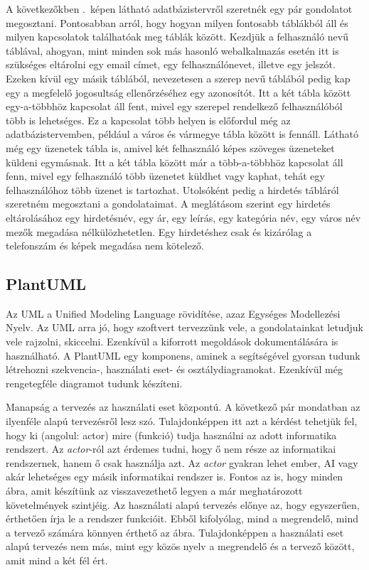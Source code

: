 \documentclass[]{thesis-ekf}
\theoremstyle{definition}
\theoremstyle{remark}
\begin{document}
	A következőkben .~képen látható adatbázistervről szeretnék egy pár gondolatot megosztani. Pontosabban arról, hogy hogyan milyen fontosabb táblákból áll és milyen kapcsolatok találhatóak meg táblák között. Kezdjük a felhasználó nevű táblával, ahogyan, mint minden sok más hasonló webalkalmazás esetén itt is szükséges eltárolni egy email címet, egy felhasználónevet, illetve egy jelszót. Ezeken kívül egy másik táblából, nevezetesen a szerep nevű táblából pedig kap egy a megfelelő jogosultság ellenőrzéséhez egy azonosítót. Itt a két tábla között egy-a-többhöz kapcsolat áll fent, mivel egy szerepel rendelkező felhasználóból több is lehetséges. Ez a kapcsolat több helyen is előfordul még az adatbázistervemben, például a város és vármegye tábla között is fennáll. Látható még egy üzenetek tábla is, amivel két felhasználó képes szöveges üzeneteket küldeni egymásnak. Itt a két tábla között már a több-a-többhöz kapcsolat áll fenn, mivel egy felhasználó több üzenetet küldhet vagy kaphat, tehát egy felhasználóhoz több üzenet is tartozhat. Utolsóként pedig a hirdetés tábláról szeretném megosztani a gondolataimat. A meglátásom szerint egy hirdetés eltárolásához egy hirdetésnév, egy ár, egy leírás, egy kategória név, egy város név mezők megadása nélkülözhetetlen. Egy hirdetéshez csak és kizárólag a telefonszám és képek megadása nem kötelező. 
	
	\subsection{PlantUML}\label{sc-plantuml}
	Az UML a Unified Modeling Language rövidítése, azaz Egységes Modellezési Nyelv. Az UML arra jó, hogy szoftvert tervezzünk vele, a gondolatainkat letudjuk vele rajzolni, skiccelni. Ezenkívül a kiforrott megoldások dokumentálására is használható. A PlantUML egy komponens, aminek a segítségével gyorsan tudunk létrehozni szekvencia-, használati eset- és osztálydiagramokat. Ezenkívül még rengetegféle diagramot tudunk készíteni. \cite{PlantUML}
	
	Manapság a tervezés az használati eset központú. A következő pár mondatban az ilyenféle alapú tervezésről lesz szó. Tulajdonképpen itt azt a kérdést tehetjük fel, hogy ki (angolul: actor) mire (funkció) tudja használni az adott informatika rendszert. Az \emph{actor}-ról azt érdemes tudni, hogy ő nem része az informatikai rendszernek, hanem ő csak használja azt. Az \emph{actor} gyakran lehet ember, AI vagy akár lehetséges egy másik informatikai rendszer is. Fontos az is, hogy minden ábra, amit készítünk az visszavezethető legyen a már meghatározott követelmények szintjéig. Az használati alapú tervezés előnye az, hogy egyszerűen, érthetően írja le a rendszer funkcióit. Ebből kifolyólag, mind a megrendelő, mind a tervező számára könnyen érthető az ábra. Tulajdonképpen a használati eset alapú tervezés nem más, mint egy közös nyelv a megrendelő és a tervező között, amit mind a két fél ért.\cite{Kusper Informatikai}
	
\end{document}
